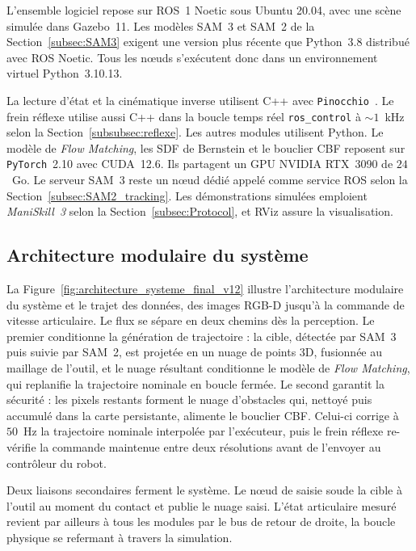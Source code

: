 L'ensemble logiciel repose sur \ac{ROS}~1 Noetic sous Ubuntu 20.04, avec une scène simulée dans Gazebo~11. Les modèles \ac{SAM}~3 et \ac{SAM}~2 de la Section~\ref{subsec:SAM3} exigent une version plus récente que Python~3.8 distribué avec \ac{ROS} Noetic. Tous les nœuds s'exécutent donc dans un environnement virtuel Python~3.10.13.

La lecture d'état et la cinématique inverse utilisent C++ avec \texttt{Pinocchio}~\cite{Carpentier2019Pinocchio}. Le frein réflexe utilise aussi C++ dans la boucle temps réel \texttt{ros\_control} à ${\sim}1$~kHz selon la Section~\ref{subsubsec:reflexe}. Les autres modules utilisent Python. Le modèle de \textit{Flow Matching}, les \ac{SDF} de Bernstein et le bouclier \ac{CBF} reposent sur \texttt{PyTorch}~2.10 avec \ac{CUDA}~12.6. Ils partagent un \ac{GPU} NVIDIA RTX~3090 de $24$~Go. Le serveur \ac{SAM}~3 reste un nœud dédié appelé comme service \ac{ROS} selon la Section~\ref{subsec:SAM2_tracking}. Les démonstrations simulées emploient \textit{ManiSkill~3} selon la Section~\ref{subsec:Protocol}, et RViz assure la visualisation.

\subsection{Architecture modulaire du système}\label{subsec:architecture_modulaire}
La Figure~\ref{fig:architecture_systeme_final_v12} illustre l'architecture modulaire du système et le trajet des données, des images \ac{RGB-D} jusqu'à la commande de vitesse articulaire. Le flux se sépare en deux chemins dès la perception. Le premier conditionne la génération de trajectoire : la cible, détectée par \ac{SAM}~3 puis suivie par \ac{SAM}~2, est projetée en un nuage de points 3D, fusionnée au maillage de l'outil, et le nuage résultant conditionne le modèle de \textit{Flow Matching}, qui replanifie la trajectoire nominale en boucle fermée. Le second garantit la sécurité : les pixels restants forment le nuage d'obstacles qui, nettoyé puis accumulé dans la carte persistante, alimente le bouclier \ac{CBF}. Celui-ci corrige à $50$~Hz la trajectoire nominale interpolée par l'exécuteur, puis le frein réflexe re-vérifie la commande maintenue entre deux résolutions avant de l'envoyer au contrôleur du robot.

Deux liaisons secondaires ferment le système. Le nœud de saisie soude la cible à l'outil au moment du contact et publie le nuage saisi. L'état articulaire mesuré revient par ailleurs à tous les modules par le bus de retour de droite, la boucle physique se refermant à travers la simulation.


